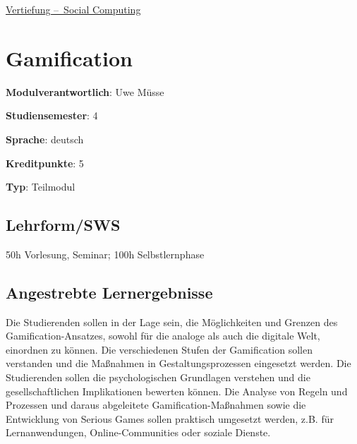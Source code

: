 \hyperref[/mi-2017/modulbeschreibungen-bachelor/BA_Vertiefung_SocialComputing]{Vertiefung – Social Computing}

\hypertarget{gamificationpathlabelmi-2017modulbeschreibungen-bachelorba_sc_gamification}{%
\chapter{Gamification\label{/mi-2017/modulbeschreibungen-bachelor/BA_SC_gamification}}\label{gamificationpathlabelmi-2017modulbeschreibungen-bachelorba_sc_gamification}}

\begin{modulHead}
\textbf{Modulverantwortlich}: Uwe
Müsse
\end{modulHead}
\begin{modulHead}
\textbf{Studiensemester}:
4
\end{modulHead}
\begin{modulHead}
\textbf{Sprache}:
deutsch
\end{modulHead}
\begin{modulHead}
\textbf{Kreditpunkte}:
5
\end{modulHead}
\begin{modulHead}
\textbf{Typ}:
Teilmodul
\end{modulHead}


\hypertarget{lehrformswspathlabelmi-2017modulbeschreibungen-bachelorba_sc_gamification}{%
\section*{Lehrform/SWS\label{/mi-2017/modulbeschreibungen-bachelor/BA_SC_gamification}}\label{lehrformswspathlabelmi-2017modulbeschreibungen-bachelorba_sc_gamification}}

50h Vorlesung, Seminar; 100h Selbstlernphase

\hypertarget{angestrebte-lernergebnissepathlabelmi-2017modulbeschreibungen-bachelorba_sc_gamification}{%
\section*{Angestrebte
Lernergebnisse\label{/mi-2017/modulbeschreibungen-bachelor/BA_SC_gamification}}\label{angestrebte-lernergebnissepathlabelmi-2017modulbeschreibungen-bachelorba_sc_gamification}}

Die Studierenden sollen in der Lage sein, die Möglichkeiten und Grenzen
des Gamification-Ansatzes, sowohl für die analoge als auch die digitale
Welt, einordnen zu können. Die verschiedenen Stufen der Gamification
sollen verstanden und die Maßnahmen in Gestaltungsprozessen eingesetzt
werden. Die Studierenden sollen die psychologischen Grundlagen verstehen
und die gesellschaftlichen Implikationen bewerten können. Die Analyse
von Regeln und Prozessen und daraus abgeleitete Gamification-Maßnahmen
sowie die Entwicklung von Serious Games sollen praktisch umgesetzt
werden, z.B. für Lernanwendungen, Online-Communities oder soziale
Dienste.

